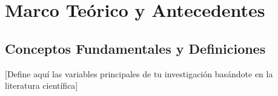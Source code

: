 %
% 
%
%

\chapter{Marco Teórico y Antecedentes}
\label{cap:marco_teorico}


\section{Conceptos Fundamentales y Definiciones}
\label{sec:conceptos_fundamentales}


[Define aquí las variables principales de tu investigación basándote en la literatura científica]

